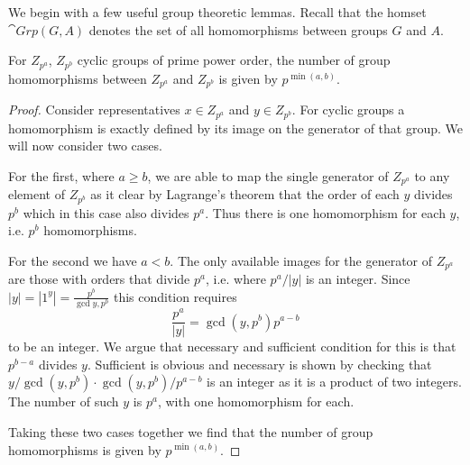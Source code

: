 We begin with a few useful group theoretic lemmas. Recall that the homset $\cat{Grp}(G,A)$ denotes the set of all homomorphisms between groups $G$ and $A$.

\begin{lemma}
\label{lem:ppowtoppow}
For $Z_{p^a}$, $Z_{p^b}$ cyclic groups of prime power order, the number of group homomorphisms between $Z_{p^a}$ and $Z_{p^b}$ is given by $p^{\min(a,b)}$.
\end{lemma}
\begin{proof} Consider representatives $x\in Z_{p^a}$ and $y\in Z_{p^b}$. For cyclic groups a homomorphism is exactly defined by its image on the generator of that group. We will now consider two cases.  

For the first, where $a\ge b$, we are able to map the single generator of $Z_{p^a}$ to any element of $Z_{p^b}$ as it clear by Lagrange's theorem that the order of each $y$ divides $p^b$ which in this case also divides $p^a$.  Thus there is one homomorphism for each $y$, i.e. $p^b$ homomorphisms.

For the second we have $a < b$. The only available images for the generator of $Z_{p^a}$ are those with orders that divide $p^a$, i.e. where $p^a/|y|$ is an integer. Since $|y| = |1^y| = \frac{p^b}{\gcd{y,p^b}}$ this condition requires
\[ \frac{p^a}{|y|} = \gcd(y,p^b)p^{a-b} \]
to be an integer. We argue that necessary and sufficient condition for this is that $p^{b-a}$ divides $y$.  Sufficient is obvious and necessary is shown by checking that $y/\gcd(y,p^b)\cdot\gcd(y,p^b)/p^{a-b}$ is an integer as it is a product of two integers. The number of such $y$ is $p^a$, with one homomorphism for each.

Taking these two cases together we find that the number of group homomorphisms is given by $p^{\min(a,b)}$.
\end{proof}

